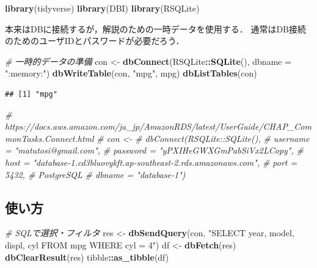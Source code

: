 \documentclass[
]{article}
\newenvironment{Shaded}{\begin{snugshade}}{\end{snugshade}}
\newcommand{\AttributeTok}[1]{\textcolor[rgb]{0.13,0.29,0.53}{#1}}
\newcommand{\CommentTok}[1]{\textcolor[rgb]{0.56,0.35,0.01}{\textit{#1}}}
\newcommand{\FunctionTok}[1]{\textcolor[rgb]{0.13,0.29,0.53}{\textbf{#1}}}
\newcommand{\NormalTok}[1]{#1}
\newcommand{\OtherTok}[1]{\textcolor[rgb]{0.56,0.35,0.01}{#1}}
\newcommand{\SpecialCharTok}[1]{\textcolor[rgb]{0.81,0.36,0.00}{\textbf{#1}}}
\newcommand{\StringTok}[1]{\textcolor[rgb]{0.31,0.60,0.02}{#1}}
\begin{document}
\begin{Shaded}
\begin{Highlighting}[]
\FunctionTok{library}\NormalTok{(tidyverse)}
\FunctionTok{library}\NormalTok{(DBI)}
\FunctionTok{library}\NormalTok{(RSQLite)}
\end{Highlighting}
\end{Shaded}

本来はDBに接続するが，解説のための一時データを使用する．
通常はDB接続のためのユーザIDとパスワードが必要だろう．

\begin{Shaded}
\begin{Highlighting}[]
  \CommentTok{\# 一時的データの準備}
\NormalTok{con }\OtherTok{\textless{}{-}} \FunctionTok{dbConnect}\NormalTok{(RSQLite}\SpecialCharTok{::}\FunctionTok{SQLite}\NormalTok{(), }\AttributeTok{dbname =} \StringTok{":memory:"}\NormalTok{)}
\FunctionTok{dbWriteTable}\NormalTok{(con, }\StringTok{"mpg"}\NormalTok{, mpg)}
\FunctionTok{dbListTables}\NormalTok{(con)}
\end{Highlighting}
\end{Shaded}

\begin{verbatim}
## [1] "mpg"
\end{verbatim}

\begin{Shaded}
\begin{Highlighting}[]
  \CommentTok{\# https://docs.aws.amazon.com/ja\_jp/AmazonRDS/latest/UserGuide/CHAP\_CommonTasks.Connect.html}
  \CommentTok{\# con \textless{}{-} }
  \CommentTok{\#   dbConnect(RSQLite::SQLite(), }
  \CommentTok{\#   username = "matutosi@gmail.com",}
  \CommentTok{\#   password = "yPXIHeGWXGmPabSiVx2LCopy",}
  \CommentTok{\#   host = "database{-}1.cd3bluovykft.ap{-}southeast{-}2.rds.amazonaws.com", }
  \CommentTok{\#   port = 5432, \# PostgreSQL}
  \CommentTok{\#   dbname = "database{-}1")}
\end{Highlighting}
\end{Shaded}

\hypertarget{ux4f7fux3044ux65b9-2}{%
\subsection{使い方}\label{ux4f7fux3044ux65b9-2}}

\begin{Shaded}
\begin{Highlighting}[]
  \CommentTok{\# SQLで選択・フィルタ}
\NormalTok{res }\OtherTok{\textless{}{-}} \FunctionTok{dbSendQuery}\NormalTok{(con, }\StringTok{"SELECT year, model, displ, cyl FROM mpg WHERE cyl = 4"}\NormalTok{)}
\NormalTok{df }\OtherTok{\textless{}{-}} \FunctionTok{dbFetch}\NormalTok{(res)}
\FunctionTok{dbClearResult}\NormalTok{(res)}
\NormalTok{tibble}\SpecialCharTok{::}\FunctionTok{as\_tibble}\NormalTok{(df)}
\end{Highlighting}
\end{Shaded}
\end{document}
